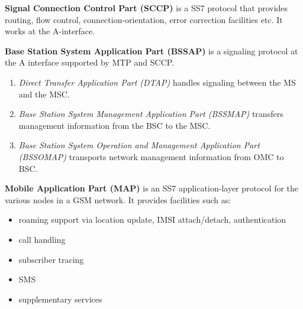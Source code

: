 \textbf{Signal Connection Control Part (SCCP)} is a SS7 protocol that provides routing, flow control, connection-orientation, error correction facilities etc. It
 works at the A-interface.
 
 
\textbf{Base Station System Application Part (BSSAP)} is a signaling protocol at the A interface supported by MTP and SCCP.
 \begin{enumerate}
  \item \textit{Direct Transfer Application Part (DTAP)} handles signaling between the MS and the MSC.
  \item \textit{Base Station System Management Application Part (BSSMAP)} transfers management information from the BSC to the MSC.
  \item \textit{Base Station System Operation and Management Application Part (BSSOMAP)} transports network management information from
  OMC to BSC.
 \end{enumerate}


\textbf{Mobile Application Part (MAP)} is an SS7 application-layer protocol for the various nodes in a GSM network.
 It provides facilities such as:
  \begin{itemize}
   \item roaming support via location update, IMSI attach/detach, authentication
   \item call handling
   \item subscriber tracing
   \item SMS
   \item supplementary services
  \end{itemize}



